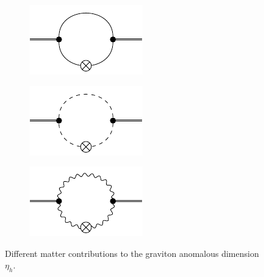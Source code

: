  \begin{figure}[H]
 \centering
 \hfill
 \begin{subfigure}{0.3\textwidth} 
	\includegraphics[width=\textwidth]{figs/TikZ/fermion_contribution}
 \end{subfigure}
 \hfill
 \begin{subfigure}{0.3\textwidth} 
 	\includegraphics[width=\textwidth]{figs/TikZ/scalar_contribution}
 \end{subfigure} 
 \hfill
 \begin{subfigure}{0.3\textwidth} 
 	\includegraphics[width=\textwidth]{figs/TikZ/gauge_field_contribution}
 \end{subfigure} 
 \hfill
 \caption{Different matter contributions to the graviton anomalous dimension $\eta_h$.}	
 \end{figure}
 
